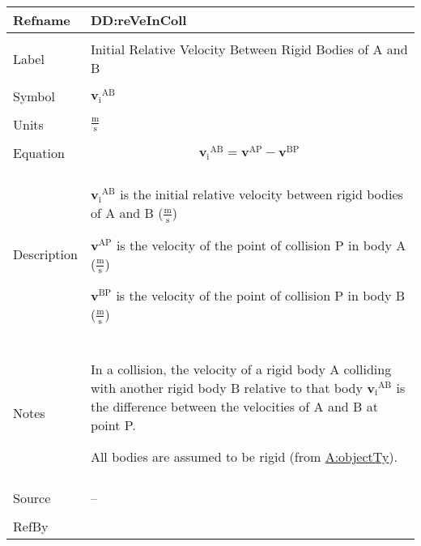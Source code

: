 \documentclass[12pt]{article}
\begin{document}
\vspace{\baselineskip}
\noindent
\begin{minipage}{\textwidth}
\begin{tabular}{>{\raggedright}p{}>{\raggedright\arraybackslash}p{}}
\toprule \textbf{Refname} & \textbf{DD:reVeInColl}
\label{DD:reVeInColl}
\\ \midrule \\
Label & Initial Relative Velocity Between Rigid Bodies of A and B
        
\\ \midrule \\
Symbol & ${{\symbf{v}_{\text{i}}}^{\text{A}\text{B}}}$
         
\\ \midrule \\
Units & $\frac{\text{m}}{\text{s}}$
        
\\ \midrule \\
Equation & \begin{displaymath}
           {{\symbf{v}_{\text{i}}}^{\text{A}\text{B}}}={\symbf{v}^{\text{A}\text{P}}}-{\symbf{v}^{\text{B}\text{P}}}
           \end{displaymath}
\\ \midrule \\
Description & \begin{symbDescription}
              \item{${{\symbf{v}_{\text{i}}}^{\text{A}\text{B}}}$ is the initial relative velocity between rigid bodies of A and B ($\frac{\text{m}}{\text{s}}$)}
              \item{${\symbf{v}^{\text{A}\text{P}}}$ is the velocity of the point of collision P in body A ($\frac{\text{m}}{\text{s}}$)}
              \item{${\symbf{v}^{\text{B}\text{P}}}$ is the velocity of the point of collision P in body B ($\frac{\text{m}}{\text{s}}$)}
              \end{symbDescription}
\\ \midrule \\
Notes & In a collision, the velocity of a rigid body A colliding with another rigid body B relative to that body ${{\symbf{v}_{\text{i}}}^{\text{A}\text{B}}}$ is the difference between the velocities of A and B at point P.
        
        All bodies are assumed to be rigid (from \hyperref[assumpOT]{A:objectTy}).
        
\\ \midrule \\
Source & --
         
\\ \midrule \\
RefBy & 
\\ \bottomrule
\end{tabular}
\end{minipage}
\end{document}
